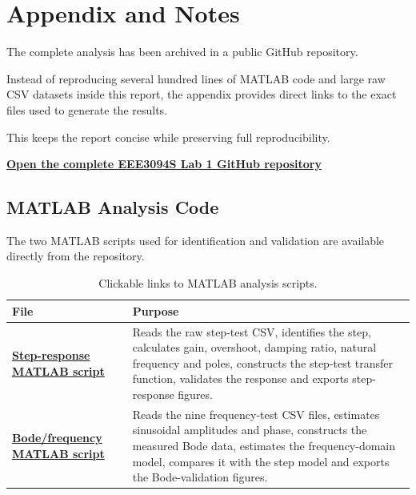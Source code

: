\documentclass[12pt,a4paper]{article}
\newcommand{\repourl}{
https://github.com/NateDogg247/EEE3094S---Lab1-System-Identification
}
\newcommand{\stepcodeurl}{
https://github.com/NateDogg247/EEE3094S---Lab1-System-Identification/blob/main/Matlab/step_response_validation.m
}
\newcommand{\bodecodeurl}{
https://github.com/NateDogg247/EEE3094S---Lab1-System-Identification/blob/main/Matlab/bode_validation.m
}
\begin{document}
\appendix

\section{Appendix and Notes}
\label{sec:appendix}

The complete analysis has been archived in a public GitHub
repository.

Instead of reproducing several hundred lines of MATLAB code and
large raw CSV datasets inside this report, the appendix provides
direct links to the exact files used to generate the results.

This keeps the report concise while preserving full
reproducibility.

\begin{center}
    \href{\repourl}{
        \textbf{
            Open the complete EEE3094S Lab 1 GitHub repository
        }
    }
\end{center}

\subsection{MATLAB Analysis Code}

The two MATLAB scripts used for identification and validation are
available directly from the repository.

\begin{table}[H]
    \centering
    \caption{Clickable links to MATLAB analysis scripts.}
    \label{tab:codelinks}

    \renewcommand{\arraystretch}{1.35}

    \begin{tabular}{
        |>{\raggedright\arraybackslash}p{}
        |>{\raggedright\arraybackslash}p{}|
    }
        \hline

        \rowcolor{gray!15}
        \textbf{File} &
        \textbf{Purpose} \\

        \hline

        \href{\stepcodeurl}{
            \textbf{Step-response MATLAB script}
        }
        &
        Reads the raw step-test CSV, identifies the step, calculates gain,
        overshoot, damping ratio, natural frequency and poles, constructs
        the step-test transfer function, validates the response and exports
        step-response figures. \\

        \hline

        \href{\bodecodeurl}{
            \textbf{Bode/frequency MATLAB script}
        }
        &
        Reads the nine frequency-test CSV files, estimates sinusoidal
        amplitudes and phase, constructs the measured Bode data, estimates
        the frequency-domain model, compares it with the step model and
        exports the Bode-validation figures. \\

        \hline
    \end{tabular}
\end{table}
\end{document}
